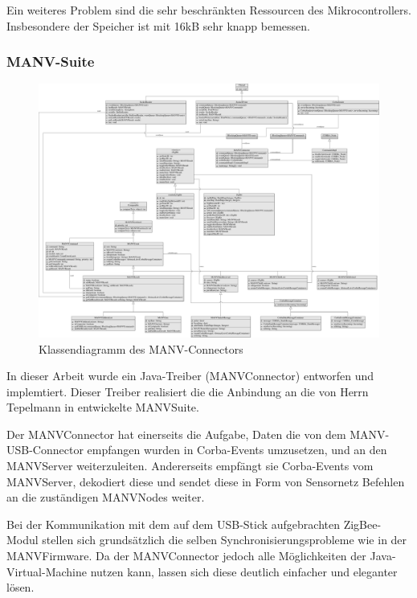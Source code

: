 Ein weiteres Problem sind die sehr beschränkten Ressourcen des Mikrocontrollers. Insbesondere der Speicher ist
mit 16kB sehr knapp bemessen. 

\subsubsection{MANV-Suite}
\begin{figure}
        \includegraphics*[width=1\textwidth]{uml_diagramme/manvconnector_uml.pdf}
        \caption{Klassendiagramm des MANV-Connectors}
        \label{klassendiagramm_manvconnector}
\end{figure}

In dieser Arbeit wurde ein Java-Treiber (MANVConnector) entworfen und implemtiert. Dieser Treiber realisiert die die Anbindung an
die von Herrn Tepelmann in \cite{Jan} entwickelte MANVSuite.

Der MANVConnector hat einerseits die Aufgabe, Daten die von dem MANV-USB-Connector empfangen wurden in Corba-Events 
umzusetzen, und an den MANVServer weiterzuleiten. Andererseits empfängt sie Corba-Events vom MANVServer, dekodiert
diese und sendet diese in Form von Sensornetz Befehlen an die zuständigen MANVNodes weiter.

Bei der Kommunikation mit dem auf dem USB-Stick aufgebrachten ZigBee-Modul stellen sich grundsätzlich die selben 
Synchronisierungsprobleme wie in der MANVFirmware. Da der MANVConnector jedoch alle Möglichkeiten der Java-Virtual-Machine
nutzen kann, lassen sich diese deutlich einfacher und eleganter lösen.

